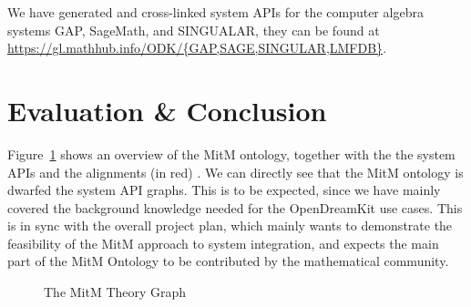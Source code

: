 \documentclass[book]{deliverablereport}
\begin{document}
We have generated and cross-linked system APIs for the computer algebra systems GAP,
SageMath, and SINGUALAR, they can be found at
\url{https://gl.mathhub.info/ODK/{GAP,SAGE,SINGULAR,LMFDB}}.

\section{Evaluation \& Conclusion}\label{sec:concl}
Figure~\ref{fig:MitM-graph} shows an overview of the MitM ontology, together with the the
system APIs and the alignments (in red) . We can directly see
that the MitM ontology is dwarfed the system API graphs. This is to be expected, since we
have mainly covered the background knowledge needed for the OpenDreamKit use cases. This
is in sync with the overall project plan, which mainly wants to demonstrate the
feasibility of the MitM approach to system integration, and expects the main part of the
MitM Ontology to be contributed by the mathematical community.  

\begin{figure}\centering
  \caption{The MitM Theory Graph}\label{fig:MitM-graph}
\end{figure}
\printbibliography
\end{document}

